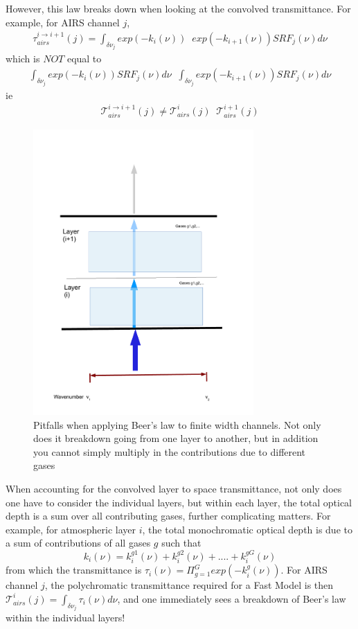 \documentclass[11pt]{article}
\begin{document}
However, this law breaks down when looking at the convolved transmittance. For example, for AIRS channel $j$,
\begin{eqnarray*}
  \tau_{airs}^{i \rightarrow i+1}(j) = \int_{\delta \nu_{j}} exp(-k_{i}(\nu)) \;\; exp(-k_{i+1}(\nu)) SRF_{j}(\nu) d\nu
\end{eqnarray*}
which is $NOT$ equal to 
\begin{eqnarray*}
  \int_{\delta \nu_{j}} exp(-k_{i}(\nu)) SRF_{j}(\nu) d\nu \;\; \int_{\delta \nu_{j}} exp(-k_{i+1}(\nu)) SRF_{j}(\nu) d\nu
\end{eqnarray*}
ie 
\begin{eqnarray*}
\mathcal{T}_{airs}^{i \rightarrow i+1}(j) \ne  \mathcal{T}_{airs}^{i}(j) \;\; \mathcal{T}_{airs}^{i+1}(j)
\end{eqnarray*}

\begin{figure}
\centering
\includegraphics[width=0.75\textwidth]{twolayers.pdf}
\caption{
Pitfalls when applying Beer's law to finite width channels. Not only does it breakdown going from one layer to 
another, but in addition you cannot simply multiply in the contributions due to different gases
}
\end{figure}


When accounting for the convolved layer to space transmittance, not only does one have to consider the individual layers,
but within each layer, the total optical depth is a sum over all contributing gases, further complicating matters. 
For example, for atmospheric layer $i$, the total monochromatic optical depth is due to a sum of contributions of all 
gases $g$ such that 
\[
k_i(\nu) = k_i^{g1}(\nu) + k_i^{g2}(\nu) + .... + k_i^{gG}(\nu)
\]
from which the transmittance is $\tau_{i}(\nu) = \Pi_{g=1}^G exp(-k_i^{g}(\nu))$. For AIRS channel $j$, the polychromatic 
transmittance required for a Fast Model is then $\mathcal{T}_{airs}^{i}(j) = \int_{\delta \nu_{j}}  \tau_{i}(\nu) d\nu$, 
and one immediately sees a breakdown of Beer's law within the individual layers!
\end{document}
